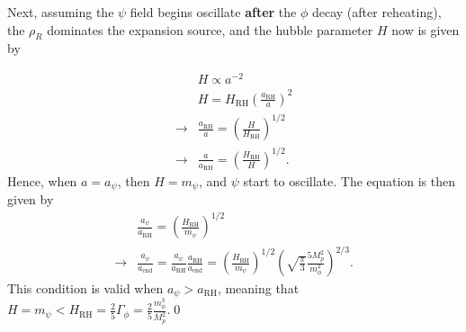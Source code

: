 Next, assuming the $\psi$ field begins oscillate \textbf{after} the $\phi$ decay (after reheating), the $\rho_R$ dominates the expansion source, and the hubble parameter $H$ now is given by

\begin{align}
    &H\propto a^{-2} \\
    &H=H_\text{RH}\left(\frac{a_\text{RH}}{a}\right)^{2}\\
    \rightarrow& \frac{a_\text{RH}}{a} = \left(\frac{H}{H_\text{RH}}\right)^{1/2}\\
    \rightarrow& \frac{a}{a_\text{RH}} = \left(\frac{H_\text{RH}}{H}\right)^{1/2}.
\end{align}
Hence, when $a=a_\psi$, then $H=m_\psi$, and $\psi$ start to oscillate. The equation is then given by 
\begin{align}
    &\frac{a_\psi}{a_\text{RH}}=\left(\frac{H_\text{RH}}{m_\psi}\right)^{1/2}\\
    \rightarrow&\frac{a_\psi}{a_\text{end}}= \frac{a_\psi}{a_\text{RH}} \frac{a_\text{RH}}{a_\text{end}}=\left(\frac{H_\text{RH}}{m_\psi}\right)^{1/2} \left(\sqrt{\frac{\pi}{3}}  \frac{5M_p^2}{m_\phi^2}\right)^{2/3}.
\end{align}
This condition is valid when $a_\psi>a_\text{RH}$, meaning that $H=m_\psi<H_\text{RH}=\frac{2}{5} \Gamma_\phi = \frac{2}{5} \frac{m_\phi^3}{M_p^2}$.\qed


